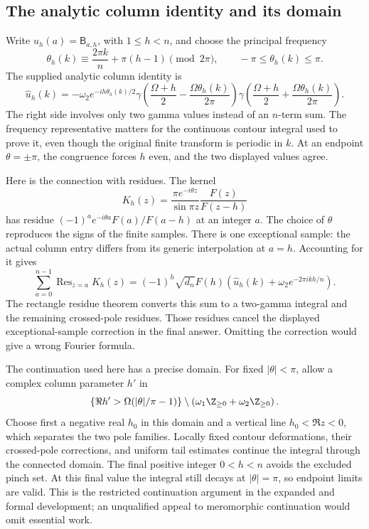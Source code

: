 \subsection{The analytic column identity and its domain}

Write $u_h(a)=\mathsf B_{a,h}$, with $1\leq h<n$, and choose
the principal frequency
\[
 \theta_h(k)\equiv\frac{2\pi k}{n}+\pi(h-1)\pmod{2\pi},
 \qquad -\pi\leq\theta_h(k)\leq\pi.
\]
The supplied analytic column identity is
\begin{equation}\label{eq:HI-column-transform}
 \widehat u_h(k)=-\omega_2e^{-ih\theta_h(k)/2}
 \gamma\left(\frac{\Omega+h}{2}-\frac{\Omega\theta_h(k)}{2\pi}\right)
 \gamma\left(\frac{\Omega+h}{2}+\frac{\Omega\theta_h(k)}{2\pi}\right).
\end{equation}
The right side involves only two gamma values instead of an
$n$-term sum. The frequency representative matters for the
continuous contour integral used to prove it, even though the
original finite transform is periodic in $k$. At an endpoint
$\theta=\pm\pi$, the congruence forces $h$ even, and the two
displayed values agree.

Here is the connection with residues. The kernel
\[
 K_h(z)=\frac{\pi e^{-i\theta z}}{\sin\pi z}
          \frac{F(z)}{F(z-h)}
\]
has residue $(-1)^ae^{-i\theta a}F(a)/F(a-h)$ at an integer
$a$. The choice of $\theta$ reproduces the signs of the finite
samples. There is one exceptional sample: the actual column
entry differs from its generic interpolation at $a=h$.
Accounting for it gives
\[
 \sum_{a=0}^{n-1}\operatorname{Res}_{z=a}K_h(z)
 =(-1)^h\sqrt{d_n}F(h)
   \left(\widehat u_h(k)+\omega_2e^{-2\pi ikh/n}\right).
\]
The rectangle residue theorem converts this sum to a two-gamma
integral and the remaining crossed-pole residues. Those residues
cancel the displayed exceptional-sample correction in the final
answer. Omitting the correction would give a wrong Fourier formula.

The continuation used here has a precise domain. For fixed
$|\theta|<\pi$, allow a complex column parameter $h'$ in
\[
 \left\{\Re h'>\Omega(|\theta|/\pi-1)\right\}
 \setminus\left(\omega_1\Z_{\geq0}+\omega_2\Z_{\geq0}\right).
\]
Choose first a negative real $h_0$ in this domain and a vertical
line $h_0<\Re z<0$, which separates the two pole families.
Locally fixed contour deformations, their crossed-pole corrections,
and uniform tail estimates continue the integral through the
connected domain. The final positive integer $0<h<n$ avoids
the excluded pinch set. At this final value the integral still
decays at $|\theta|=\pi$, so endpoint limits are valid. This is
the restricted continuation argument in the expanded and formal
development; an unqualified appeal to meromorphic continuation
would omit essential work.

